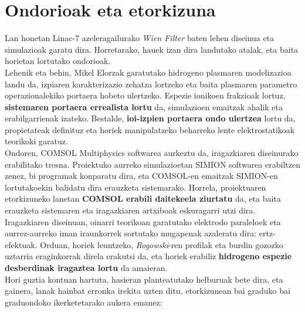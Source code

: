 \documentclass[12pt]{article}
\numberwithin{figure}{section}
\numberwithin{equation}{section}
\begin{document}
\newpage
\section{Ondorioak eta etorkizuna}
Lan honetan Linac-7 azeleragailurako \textit{Wien Filter} baten lehen diseinua eta simulazioak garatu dira. Horretarako, hauek izan dira landutako atalak, eta baita horietan lortutako ondorioak.\\

Lehenik eta behin, Mikel Elorzak garatutako hidrogeno plasmaren modelizazioa landu da, izpiaren karakterizazio zehatza lortzeko eta baita plasmaren parametro operazionalekiko portaera hobeto ulertzeko. Espezie ionikoen frakzioak lortuz, \textbf{sistemaren portaera errealista lortu} da, simulazioen emaitzak ahalik eta erabilgarrienak izateko. Bestalde, \textbf{ioi-izpien portaera ondo ulertzea} lortu da, propietateak definituz eta horiek manipulatzeko beharreko lente elektrostatikoak teorikoki garatuz.  \\

Ondoren, COMSOL Multiphysics softwarea aurkeztu da, iragazkiaren diseinurako erabilitako tresna. Proiektuko aurreko simulazioetan SIMION softwarea erabiltzen zenez, bi programak konparatu dira, eta COMSOL-en emaitzak SIMION-en lortutakoekin balidatu dira erauzketa sistemarako. Horrela, proiektuaren etorkizuneko lanetan \textbf{COMSOL erabili daitekeela ziurtatu} da, eta baita erauzketa sistemaren eta iragazkiaren artxiboak eskuragarri utzi dira.\\

Iragazkiaren diseinuan, oinarri teorikoan garatutako elektrodo paraleloek eta aurrez-aurreko iman iraunkorrek sortutako mugapenak azaleratu dira: ertz-efektuak. Orduan, horiek leuntzeko, \textit{Rogowski}-ren profilak eta burdin gozozko uztarria eraginkorrak direla erakutsi da, eta horiek erabiliz \textbf{hidrogeno espezie desberdinak iragaztea lortu} da amaieran.\\

Hori guztia kontuan hartuta, hasieran planteatutako helburuak bete dira, eta gainera, lanak hainbat erronka irekita uzten ditu, etorkizunean bai graduko bai graduondoko ikerketetarako aukera emanez:\\
\end{document}
